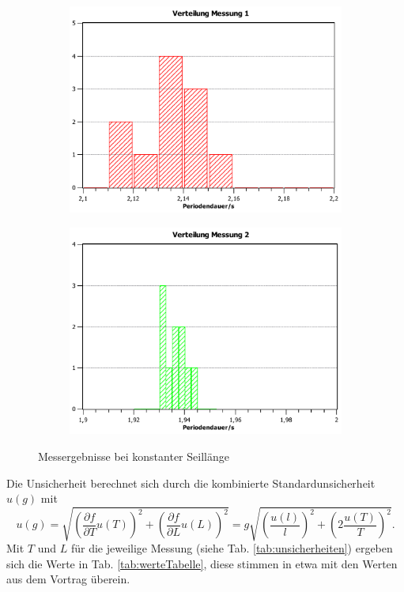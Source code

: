 \documentclass[11pt,a4paper,titlepage, ngerman]{article}
\begin{document}
			\begin{figure}[ht]
				\begin{subfigure}{0.5\textwidth}
					\centering
					\includegraphics[scale=0.35]{VerteilungMessung1.pdf}
				\end{subfigure}
				\begin{subfigure}{0.5\textwidth}
					\centering
					\includegraphics[scale=0.35]{VerteilungMessung2.pdf}
				\end{subfigure}		
				\caption{Messergebnisse bei konstanter Seillänge}
				\label{fig:seilKonst}
			\end{figure}
		
			Die Unsicherheit berechnet sich durch die kombinierte Standardunsicherheit $u(g)$ mit
			\begin{equation*}
				u(g) = \sqrt{
				\left( \frac{\partial f}{\partial T} u(T) \right)^2 +
				\left( \frac{\partial f}{\partial L} u(L) \right)^2
				}
				= g \sqrt{\left(\frac{u(l)}{l}\right)^2 + \left(2\frac{u(T)}{T}\right)^2}.
			\end{equation*}
			Mit $T$ und $L$ für die jeweilige Messung (siehe Tab. \ref{tab:unsicherheiten}) ergeben sich die Werte in Tab. \ref{tab:werteTabelle}, diese stimmen in etwa mit den Werten aus dem Vortrag überein.
			
\end{document}
